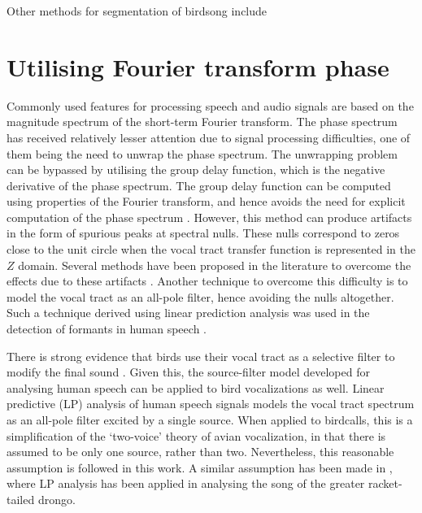 \documentclass[a4paper]{article}
\begin{document}
Other methods for segmentation of birdsong include

\section{Utilising Fourier transform phase}

Commonly used features for processing speech and audio signals are based on the
magnitude spectrum of the short-term Fourier transform. The phase spectrum has
received relatively lesser attention due to signal processing difficulties, one
of them being the need to unwrap the phase spectrum. The unwrapping problem can be
bypassed by utilising the group delay function, which is the negative derivative
of the phase spectrum. The group delay function can be
computed using properties of the Fourier transform, and hence avoids the need
for explicit computation of the phase spectrum \cite{gdDeriv}. 
However, this method can produce
artifacts in the form of spurious peaks at spectral nulls. These nulls
correspond to zeros close to the unit circle when the vocal tract transfer
function is represented in the $Z$ domain. 
Several methods have been proposed in the literature to overcome the effects due
to these artifacts \cite{modgdf, productSpectrum}. Another technique to overcome
this difficulty is to model the vocal tract as an all-pole filter, hence
avoiding the nulls altogether. Such a
technique derived using linear prediction analysis was used in the detection of
formants in human speech \cite{yegnaFormant}. 


There is strong evidence that birds use their vocal tract as a selective filter
to modify the final sound \cite{catchpole}.  Given this, the source-filter model
developed for analysing human speech can be applied to bird vocalizations as
well.  Linear predictive (LP) analysis of human speech signals models the vocal
tract spectrum as an all-pole filter \cite{makhoul} excited by a single source.
When applied to birdcalls, this is a simplification of the `two-voice' theory of
avian vocalization\cite{catchpoole}, in that there is assumed to be only one
source, rather than two. Nevertheless, this reasonable assumption is followed in
this work. A similar assumption has been made in \cite{agnihotri}, where LP
analysis has been applied in analysing the song of the greater racket-tailed
drongo.
\end{document}

